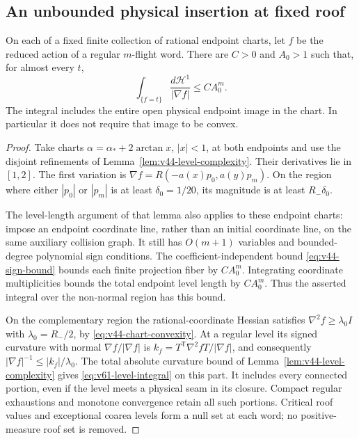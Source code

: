 \subsection{An unbounded physical insertion at fixed roof}
\begin{lemma}
\label{lem:v61-endpoint-level-integral}
On each of a fixed finite collection of rational endpoint charts,
let $f$ be the reduced action of a regular $m$-flight word. There
are $C>0$ and $A_0>1$ such that, for almost every $t$,
\begin{equation}\label{eq:v61-level-integral}
 \int_{\{f=t\}}\frac{d\mathcal H^1}{|\nabla f|}\le CA_0^m.
\end{equation}
The integral includes the entire open physical endpoint image in the
chart. In particular it does not require that image to be convex.
\end{lemma}
\begin{proof}
Take charts $\alpha=\alpha_*+2\arctan x$, $|x|<1$, at both
endpoints and use the disjoint refinements of
Lemma~\ref{lem:v44-level-complexity}. Their derivatives lie in
$[1,2]$. The first variation is
$\nabla f=R(-a(x)p_0,a(y)p_m)$. On the region where either
$|p_0|$ or $|p_m|$ is at least $\delta_0=1/20$, its magnitude
is at least $R_-\delta_0$.

The level-length argument of that lemma also applies to these endpoint
charts: impose an endpoint coordinate line, rather than an initial
coordinate line, on the same auxiliary collision graph. It still has
$O(m+1)$ variables and bounded-degree polynomial sign conditions.
The coefficient-independent bound \eqref{eq:v44-sign-bound} bounds
each finite projection fiber by $CA_0^m$. Integrating coordinate
multiplicities bounds the total endpoint level length by $CA_0^m$.
Thus the asserted integral over the non-normal region has this bound.

On the complementary region the rational-coordinate Hessian satisfies
$\nabla^2f\ge\lambda_0 I$ with $\lambda_0=R_-/2$, by
\eqref{eq:v44-chart-convexity}. At a regular level its signed
curvature with normal $\nabla f/|\nabla f|$ is
$k_f=T^{\mathsf T}\nabla^2fT/|\nabla f|$, and consequently
$|\nabla f|^{-1}\le |k_f|/\lambda_0$. The total absolute
curvature bound of Lemma~\ref{lem:v44-level-complexity} gives
\eqref{eq:v61-level-integral} on this part. It includes every
connected portion, even if the level meets a physical seam in its
closure. Compact regular exhaustions and monotone convergence retain
all such portions. Critical roof values and exceptional coarea levels
form a null set at each word; no positive-measure roof set is removed.
\end{proof}

